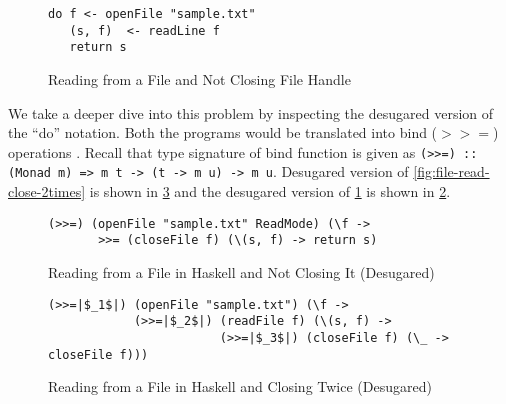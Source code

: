 \begin{figure}[h]
  \begin{framed}
    \begin{verbatim}
do f <- openFile "sample.txt"
   (s, f)  <- readLine f
   return s
    \end{verbatim}
  \end{framed}
  \caption{Reading from a File and Not Closing File Handle}
  \label{fig:file-read-noclose}
\end{figure}

We take a deeper dive into this problem by inspecting the desugared version of the ``do'' notation.
Both the programs would be translated into bind ($>>=$) operations . Recall that type signature of bind function is given as
\texttt{(>>=) :: (Monad m) => m t -> (t -> m u) -> m u}. Desugared version of \cref{fig:file-read-close-2times}
is shown in \cref{fig:file-read-close-2times-desugared} and the desugared version of \cref{fig:file-read-noclose} is shown in \cref{fig:file-read-noclose-desugared}.

\begin{figure}[h]
\begin{framed}
\begin{verbatim}
(>>=) (openFile "sample.txt" ReadMode) (\f ->
       >>= (closeFile f) (\(s, f) -> return s)
\end{verbatim}
  \end{framed}
  \caption{Reading from a File in Haskell and Not Closing It (Desugared)}
  \label{fig:file-read-noclose-desugared}
\end{figure}

\begin{figure}[h]
  \begin{framed}
    \begin{verbatim}
(>>=|$_1$|) (openFile "sample.txt") (\f ->
            (>>=|$_2$|) (readFile f) (\(s, f) ->
                        (>>=|$_3$|) (closeFile f) (\_ -> closeFile f)))
    \end{verbatim}
  \end{framed}
  \caption{Reading from a File in Haskell and Closing Twice (Desugared)}
  \label{fig:file-read-close-2times-desugared}
\end{figure}

